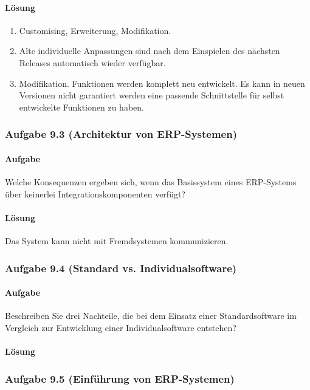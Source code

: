     \paragraph*{Lösung}
        \begin{enumerate}[label=\alph*)]
            \item Customising, Erweiterung, Modifikation.
            \item Alte individuelle Anpassungen sind nach dem Einspielen des nächsten Releases automatisch wieder verfügbar.
            \item Modifikation. Funktionen werden komplett neu entwickelt. Es kann in neuen Versionen nicht garantiert werden eine passende Schnittstelle für selbst entwickelte Funktionen zu haben.
        \end{enumerate}

\subsubsection*{Aufgabe 9.3 (Architektur von ERP-Systemen)}
    \paragraph*{Aufgabe}
        Welche Konsequenzen ergeben sich, wenn das Basissystem eines ERP-Systems über keinerlei
        Integrationskomponenten verfügt?
    \paragraph*{Lösung}
        Das System kann nicht mit Fremdsystemen kommunizieren.

\subsubsection*{Aufgabe 9.4 (Standard vs. Individualsoftware)}
    \paragraph*{Aufgabe}
        Beschreiben Sie drei Nachteile, die bei dem Einsatz einer Standardsoftware im Vergleich zur
        Entwicklung einer Individualsoftware entstehen?
    \paragraph*{Lösung}
        

\subsubsection*{Aufgabe 9.5 (Einführung von ERP-Systemen)}
